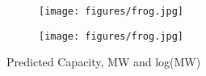 
\begin{figure}[H]
\centering
\begin{subfigure}{.5\textwidth}
  \centering
  \texttt{[image: figures/frog.jpg]}
\end{subfigure}%
\begin{subfigure}{.5\textwidth}
  \centering
  \texttt{[image: figures/frog.jpg]}
\end{subfigure}
\caption{Predicted Capacity, MW and log(MW)}
\label{fig:pred-capacity-hists}
\end{figure}